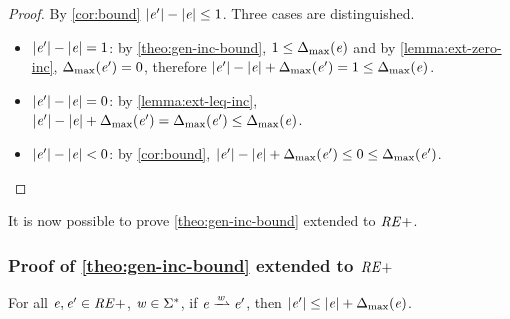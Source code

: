 \begin{proof}
 By \cref{cor:bound} ${\mid}{\mathit {e}'}{\mid}-{\mid}{\mathit {e}}{\mid}\leq 1$.
 Three cases are distinguished.
 \begin{itemize}
  \item ${\mid}{\mathit {e}'}{\mid}-{\mid}{\mathit {e}}{\mid}=1$: by \cref{theo:gen-inc-bound}, $1\leq{\Delta_{\max}}({\mathit {e}})$ and by \cref{lemma:ext-zero-inc},
        ${\Delta_{\max}}({\mathit {e}'})=0$, therefore ${\mid}{\mathit {e}'}{\mid}-{\mid}{\mathit {e}}{\mid}+{\Delta_{\max}}({\mathit {e}'})=1\leq{\Delta_{\max}}({\mathit {e}})$.
  \item ${\mid}{\mathit {e}'}{\mid}-{\mid}{\mathit {e}}{\mid}=0$: by \cref{lemma:ext-leq-inc},
        ${\mid}{\mathit {e}'}{\mid}-{\mid}{\mathit {e}}{\mid}+{\Delta_{\max}}({\mathit {e}'})={\Delta_{\max}}({\mathit {e}'})\leq{\Delta_{\max}}({\mathit {e}})$.
  \item ${\mid}{\mathit {e}'}{\mid}-{\mid}{\mathit {e}}{\mid}<0$: by \cref{cor:bound},
        ${\mid}{\mathit {e}'}{\mid}-{\mid}{\mathit {e}}{\mid}+{\Delta_{\max}}({\mathit {e}'})\leq 0 \leq {\Delta_{\max}}({\mathit {e}'})$.
 \end{itemize}
\end{proof}

It is now possible to prove \cref{theo:gen-inc-bound} extended to $\mathit {RE+}$.

\subsubsection*{Proof of \cref{theo:gen-inc-bound} extended to $\mathit {RE+}$
}
For all $\mathit {e},\mathit {e}'\in\mathit {RE+}$, $\mathit {w}\in\Sigma^*$, if $\re\parDer{\word}\re'$, then ${\mid}{\mathit {e}'}{\mid}\leq {\mid}{\ensuremath{\mathit {e}}}{\mid}+{\Delta_{\max}}({\mathit {e}})$.

